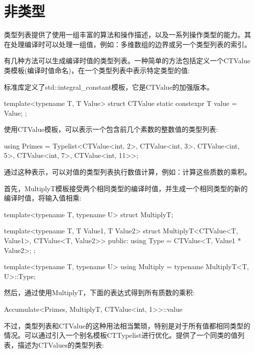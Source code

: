 \section{非类型}

类型列表提供了使用一组丰富的算法和操作描述，以及一系列操作类型的能力。其在处理编译时可以处理一组值，例如：多维数组的边界或另一个类型列表的索引。

有几种方法可以生成编译时值的类型列表。一种简单的方法包括定义一个CTValue类模板(编译时值命名)，在一个类型列表中表示特定类型的值:

\begin{notice}
标准库定义了std::integral\_constant模板，它是CTValue的加强版本。
\end{notice}

\begin{cpp}
template<typename T, T Value>
struct CTValue
{
	static constexpr T value = Value;
};
\end{cpp}

使用CTValue模板，可以表示一个包含前几个素数的整数值的类型列表:

\begin{cpp}
using Primes = Typelist<CTValue<int, 2>, CTValue<int, 3>,
						CTValue<int, 5>, CTValue<int, 7>,
						CTValue<int, 11>>;
\end{cpp}

通过这种表示，可以对值的类型列表执行数值计算，例如：计算这些质数的乘积。

首先，MultiplyT模板接受两个相同类型的编译时值，并生成一个相同类型的新的编译时值，将输入值相乘:

\begin{cpp}
template<typename T, typename U>
struct MultiplyT;

template<typename T, T Value1, T Value2>
struct MultiplyT<CTValue<T, Value1>, CTValue<T, Value2>> {
	public:
	using Type = CTValue<T, Value1 * Value2>;
};

template<typename T, typename U>
using Multiply = typename MultiplyT<T, U>::Type;
\end{cpp}

然后，通过使用MultiplyT，下面的表达式得到所有质数的乘积:

\begin{cpp}
Accumulate<Primes, MultiplyT, CTValue<int, 1>>::value
\end{cpp}

不过，类型列表和CTValue的这种用法相当繁琐，特别是对于所有值都相同类型的情况。可以通过引入一个别名模板CTTypelist进行优化。提供了一个同类的值列表，描述为CTValues的类型列表:

